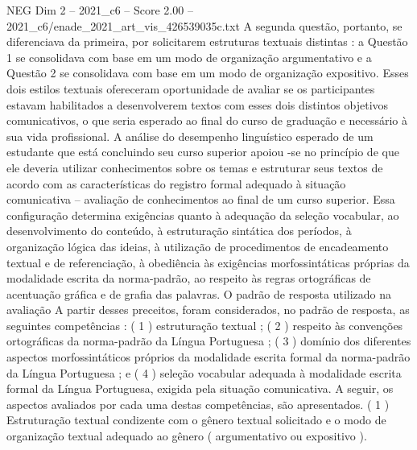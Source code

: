\begin{textsample}{NEG Dim 2 – 2021\_c6 – Score 2.00 – 2021\_c6/enade\_2021\_art\_vis\_426539035c.txt}
A segunda questão, portanto, se diferenciava da primeira, por solicitarem estruturas textuais distintas : a Questão 1 se consolidava com base em um modo de organização argumentativo e a Questão 2 se consolidava com base em um modo de organização expositivo.
Esses dois estilos textuais ofereceram oportunidade de avaliar se os participantes estavam habilitados a desenvolverem textos com esses dois distintos objetivos comunicativos, o que seria esperado ao final do curso de graduação e necessário à sua vida profissional.
A análise do desempenho linguístico esperado de um estudante que está concluindo seu curso superior apoiou -se no princípio de que ele deveria utilizar conhecimentos sobre os temas e estruturar seus textos de acordo com as características do registro formal adequado à situação comunicativa – avaliação de conhecimentos ao final de um curso superior.
Essa configuração determina exigências quanto à adequação da seleção vocabular, ao desenvolvimento do conteúdo, à estruturação sintática dos períodos, à organização lógica das ideias, à utilização de procedimentos de encadeamento textual e de referenciação, à obediência às exigências morfossintáticas próprias da modalidade escrita da norma-padrão, ao respeito às regras ortográficas de acentuação gráfica e de grafia das palavras.
O padrão de resposta utilizado na avaliação A partir desses preceitos, foram considerados, no padrão de resposta, as seguintes competências : ( 1 ) estruturação textual ; ( 2 ) respeito às convenções ortográficas da norma-padrão da Língua Portuguesa ; ( 3 ) domínio dos diferentes aspectos morfossintáticos próprios da modalidade escrita formal da norma-padrão da Língua Portuguesa ; e ( 4 ) seleção vocabular adequada à modalidade escrita formal da Língua Portuguesa, exigida pela situação comunicativa.
A seguir, os aspectos avaliados por cada uma destas competências, são apresentados. ( 1 ) Estruturação textual condizente com o gênero textual solicitado e o modo de organização textual adequado ao gênero ( argumentativo ou expositivo ).

\end{textsample}
